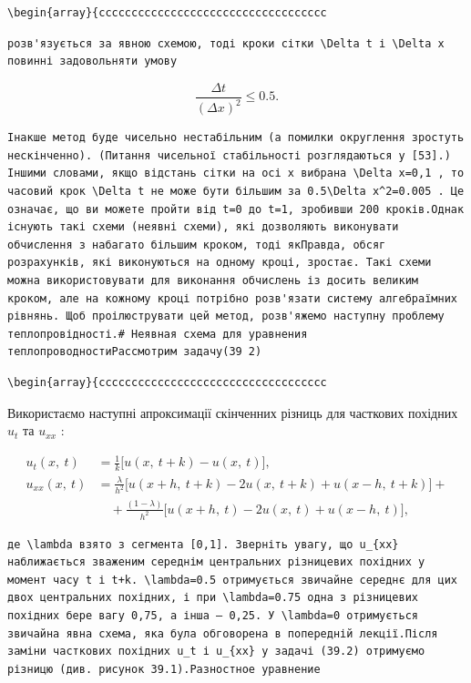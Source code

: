 \documentclass[
  ukrainian,
]{article}
\begin{document}
\begin{verbatim}
\begin{array}{ccccccccccccccccccccccccccccccccccc
\end{verbatim}

\begin{verbatim}
розв'язується за явною схемою, тоді кроки сітки \Delta t і \Delta x повинні задовольняти умову
\end{verbatim}

\[
\frac{\Delta t}{(\Delta x)^2} \leqslant 0.5.
\]

\begin{verbatim}
Інакше метод буде чисельно нестабільним (а помилки округлення зростуть нескінченно). (Питання чисельної стабільності розглядаються у [53].) Іншими словами, якщо відстань сітки на осі x вибрана \Delta x=0,1 , то часовий крок \Delta t не може бути більшим за 0.5\Delta x^2=0.005 . Це означає, що ви можете пройти від t=0 до t=1, зробивши 200 кроків.Однак існують такі схеми (неявні схеми), які дозволяють виконувати обчислення з набагато більшим кроком, тоді якПравда, обсяг розрахунків, які виконуються на одному кроці, зростає. Такі схеми можна використовувати для виконання обчислень із досить великим кроком, але на кожному кроці потрібно розв'язати систему алгебраїмних рівнянь. Щоб проілюструвати цей метод, розв'яжемо наступну проблему теплопровідності.# Неявная схема для уравнения теплопроводностиРассмотрим задачу(39 2)
\end{verbatim}

\begin{verbatim}
\begin{array}{ccccccccccccccccccccccccccccccccccc
\end{verbatim}

Використаємо наступні апроксимації скінченних різниць для часткових
похідних \(u_t\) та \(u_{xx}\) :

\[
\begin{split} u_t(x,\ t) &= \frac{1}{k} \big[ u(x,\ t+k) - u(x,\ t) \big], \\ u_{xx}(x,\ t) &= \frac{\lambda}{h^2} \big[ u(x+h,\ t+k) - 2u(x,\ t+k) + u(x-h,\ t+k) \big] + \\ &\quad + \frac{(1-\lambda)}{h^2} \big[ u(x+h,\ t) - 2u(x,\ t) + u(x-h,\ t) \big], \end{split}
\]

\begin{verbatim}
де \lambda взято з сегмента [0,1]. Зверніть увагу, що u_{xx} наближається зваженим середнім центральних різницевих похідних у момент часу t і t+k. \lambda=0.5 отримується звичайне середнє для цих двох центральних похідних, і при \lambda=0.75 одна з різницевих похідних бере вагу 0,75, а інша — 0,25. У \lambda=0 отримується звичайна явна схема, яка була обговорена в попередній лекції.Після заміни часткових похідних u_t і u_{xx} у задачі (39.2) отримуємо різницю (див. рисунок 39.1).Разностное уравнение
\end{verbatim}
\end{document}
